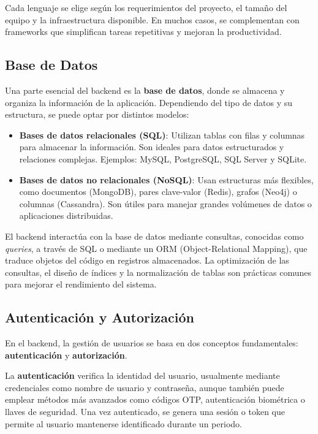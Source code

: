 \documentclass[11pt]{scrartcl}
\begin{document}
Cada lenguaje se elige según los requerimientos del proyecto, el tamaño del equipo y la infraestructura disponible. En muchos casos, se complementan con frameworks que simplifican tareas repetitivas y mejoran la productividad.

\subsection{Base de Datos}
Una parte esencial del backend es la \textbf{base de datos}, donde se almacena y organiza la información de la aplicación. Dependiendo del tipo de datos y su estructura, se puede optar por distintos modelos:

\begin{itemize}
    \item \textbf{Bases de datos relacionales (SQL)}: Utilizan tablas con filas y columnas para almacenar la información. Son ideales para datos estructurados y relaciones complejas. Ejemplos: MySQL, PostgreSQL, SQL Server y SQLite.
    \item \textbf{Bases de datos no relacionales (NoSQL)}: Usan estructuras más flexibles, como documentos (MongoDB), pares clave-valor (Redis), grafos (Neo4j) o columnas (Cassandra). Son útiles para manejar grandes volúmenes de datos o aplicaciones distribuidas.
\end{itemize}

El backend interactúa con la base de datos mediante consultas, conocidas como \textit{queries}, a través de SQL o mediante un ORM (Object-Relational Mapping), que traduce objetos del código en registros almacenados.  
La optimización de las consultas, el diseño de índices y la normalización de tablas son prácticas comunes para mejorar el rendimiento del sistema.

\subsection{Autenticación y Autorización}
En el backend, la gestión de usuarios se basa en dos conceptos fundamentales: \textbf{autenticación} y \textbf{autorización}.

La \textbf{autenticación} verifica la identidad del usuario, usualmente mediante credenciales como nombre de usuario y contraseña, aunque también puede emplear métodos más avanzados como códigos OTP, autenticación biométrica o llaves de seguridad.  
Una vez autenticado, se genera una sesión o token que permite al usuario mantenerse identificado durante un periodo.
\end{document}
